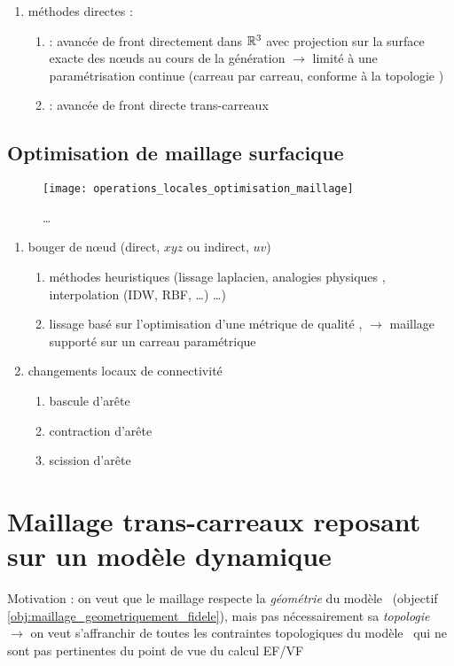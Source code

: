 \begin{enumerate}
	\item méthodes directes : 
	\begin{enumerate}
		\item \cite{lau1996} : avancée de front directement dans $\mathbb{R}^3$ avec projection sur la surface exacte des n\oe uds au cours de la génération $\to$ limité à une paramétrisation continue (\ie carreau par carreau, conforme à la topologie \brep)
		\item \cite{foucault2013} : avancée de front directe trans-carreaux
	\end{enumerate}
\end{enumerate}







\subsection{Optimisation de maillage surfacique}
\begin{figure}
\centering
\texttt{[image: operations\_locales\_optimisation\_maillage]}
\caption{\ldots}
\label{fig:operations_locales_optimisation_maillage}
\end{figure}

\begin{enumerate}
	\item bouger de n\oe ud (direct, \ie $xyz$ ou indirect, \ie $uv$)
	\begin{enumerate}
		\item méthodes heuristiques (lissage laplacien, analogies physiques \cite{farhat1998}, interpolation (IDW, RBF, \ldots) \ldots)
		\item lissage basé sur l'optimisation d'une métrique de qualité \cite{freitag1995, canann1998, jiao2008}, \cite{gargallo2014} $\to$ maillage supporté sur un carreau paramétrique
	\end{enumerate}
	\item changements locaux de connectivité
	\begin{enumerate}
		\item bascule d'arête
		\item contraction d'arête
		\item scission d'arête
	\end{enumerate}
\end{enumerate}





\section{Maillage trans-carreaux reposant sur un modèle \brep dynamique}
Motivation : on veut que le maillage respecte la \textit{géométrie} du modèle \brep\ (\cf objectif \ref{obj:maillage_geometriquement_fidele}), mais pas nécessairement sa \textit{topologie}\\
$\to$ on veut s'affranchir de toutes les contraintes topologiques du modèle \brep\ qui ne sont pas pertinentes du point de vue du calcul EF/VF


